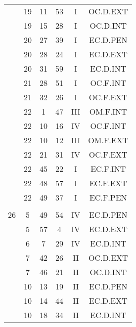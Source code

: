 \documentclass[12pt, a4paper]{article}
\begin{document}
\begin{multicols}{3}
{\begin{tabular}{c c c c c c}
	 	 	 	 & 19 & 11 & 53 & I & OC.D.EXT\\%
	 	 	 	 & 19 & 15 & 28 & I & OC.D.INT\\%
	 	 	 	 & 20 & 27 & 39 & I & EC.D.PEN\\%
	 	 	 	 & 20 & 28 & 24 & I & EC.D.EXT\\%
	 	 	 	 & 20 & 31 & 59 & I & EC.D.INT\\%
	 	 	 	 & 21 & 28 & 51 & I & OC.F.INT\\%
	 	 	 	 & 21 & 32 & 26 & I & OC.F.EXT\\%
	 	 	 	 & 22 & 1 & 47 & III & OM.F.INT\\%
	 	 	 	 & 22 & 10 & 16 & IV & OC.F.INT\\%
	 	 	 	 & 22 & 10 & 12 & III & OM.F.EXT\\%
	 	 	 	 & 22 & 21 & 31 & IV & OC.F.EXT\\%
	 	 	 	 & 22 & 45 & 22 & I & EC.F.INT\\%
	 	 	 	 & 22 & 48 & 57 & I & EC.F.EXT\\%
	 	 	 	 & 22 & 49 & 37 & I & EC.F.PEN\\%
	 	 	 	 & & & & & \\%
	 	 	 	26 & 5 & 49 & 54 & IV & EC.D.PEN\\%
	 	 	 	 & 5 & 57 & 4 & IV & EC.D.EXT\\%
	 	 	 	 & 6 & 7 & 29 & IV & EC.D.INT\\%
	 	 	 	 & 7 & 42 & 26 & II & OC.D.EXT\\%
	 	 	 	 & 7 & 46 & 21 & II & OC.D.INT\\%
	 	 	 	 & 10 & 13 & 19 & II & EC.D.PEN\\%
	 	 	 	 & 10 & 14 & 44 & II & EC.D.EXT\\%
	 	 	 	 & 10 & 18 & 34 & II & EC.D.INT\\%

\end{tabular}}
\end{multicols}
\end{document}
